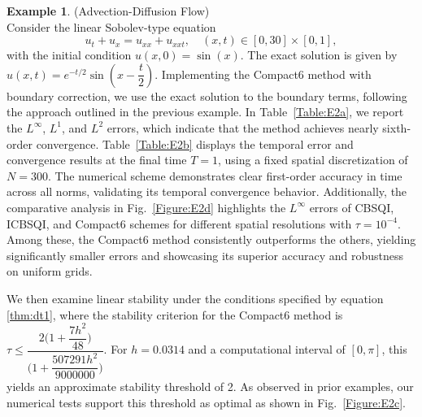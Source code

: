 \documentclass[11pt,a4paper]{amsart}
\theoremstyle{plain}
\theoremstyle{definition}
\newtheorem{example}[theorem]{Example}
\theoremstyle{remark}
\numberwithin{equation}{section}
\begin{document}
\begin{example}
\normalfont
(Advection-Diffusion Flow) \\
Consider the linear Sobolev-type equation
\begin{equation}\label{example:2}
    u_t + u_x = u_{xx} + u_{xxt}, \quad (x,t) \in [0,30] \times [0, 1],
\end{equation}
with the initial condition $u(x,0) = \sin(x)$. The exact solution is given by $u(x,t) = e^{-t/2}\sin(x-\dfrac{t}{2})$. Implementing the Compact6 method with boundary correction, we use the exact solution to the boundary terms, following the approach outlined in the previous example. In Table~\ref{Table:E2a}, we report the $L^{\infty}$, $L^{1}$, and $L^{2}$ errors, which indicate that the method achieves nearly sixth-order convergence. 
Table~\ref{Table:E2b} displays the temporal error and convergence results at the final time \( T = 1 \), using a fixed spatial discretization of \( N = 300 \). The numerical scheme demonstrates clear first-order accuracy in time across all norms, validating its temporal convergence behavior. Additionally, the comparative analysis in Fig.~\ref{Figure:E2d} highlights the $L^{\infty}$ errors of CBSQI, ICBSQI, and Compact6 schemes for different spatial resolutions with \( \tau = 10^{-4} \). Among these, the Compact6 method consistently outperforms the others, yielding significantly smaller errors and showcasing its superior accuracy and robustness on uniform grids.
\par
We then examine linear stability under the conditions specified by equation \ref{thm:dt1}, where the stability criterion for the Compact6 method is $\tau \leq \dfrac{2 \biggl(1 + \dfrac{7 h^2}{48} \biggr)}{\biggl(1+ \dfrac{507291 h^2}{9000000} \biggr)}$. For $h = 0.0314$ and a computational interval of $[0, \pi]$, this yields an approximate stability threshold of 2. As observed in prior examples, our numerical tests support this threshold as optimal as shown in Fig.~\ref{Figure:E2c}.


\end{example}
\end{document}
